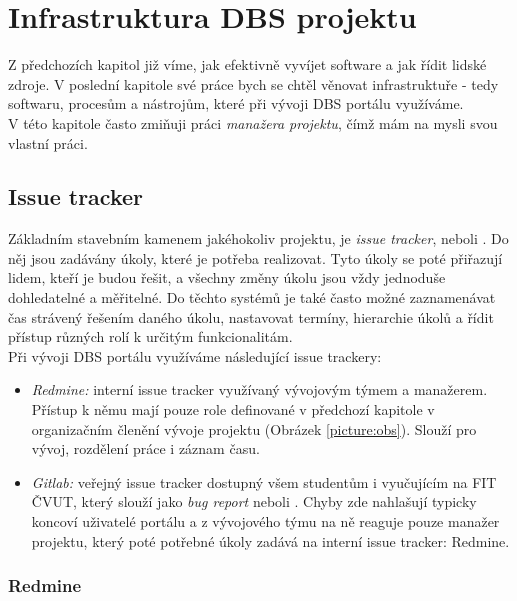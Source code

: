 \chapter{Infrastruktura DBS projektu} \label{infrastructure}

Z předchozích kapitol již víme, jak efektivně vyvíjet software a jak řídit lidské zdroje. V poslední kapitole své práce bych se chtěl věnovat infrastruktuře - tedy softwaru, procesům a nástrojům, které při vývoji DBS portálu využíváme.\\
V této kapitole často zmiňuji práci \emph{manažera projektu}, čímž mám na mysli svou vlastní práci.


\section{Issue tracker}

Základním stavebním kamenem jakéhokoliv projektu, je \emph{issue tracker}, neboli . Do něj jsou zadávány úkoly, které je potřeba realizovat. Tyto úkoly se poté přiřazují lidem, kteří je budou řešit, a všechny změny úkolu jsou vždy jednoduše dohledatelné a měřitelné. Do těchto systémů je také často možné zaznamenávat čas strávený řešením daného úkolu, nastavovat termíny, hierarchie úkolů a řídit přístup různých rolí k určitým funkcionalitám.\\
Při vývoji DBS portálu využíváme následující issue trackery:
\begin{itemize}
	\item \emph{Redmine:} interní issue tracker využívaný vývojovým týmem a manažerem. Přístup k němu mají pouze role definované v předchozí kapitole v organizačním členění vývoje projektu (Obrázek \ref{picture:obs}). Slouží pro vývoj, rozdělení práce i záznam času.
	\item \emph{Gitlab:} veřejný issue tracker dostupný všem studentům i vyučujícím na FIT ČVUT, který slouží jako \emph{bug report} neboli . Chyby zde nahlašují typicky koncoví uživatelé portálu a z vývojového týmu na ně reaguje pouze manažer projektu, který poté potřebné úkoly zadává na interní issue tracker: Redmine.
\end{itemize}

\subsection{Redmine} \label{if:redmine}


